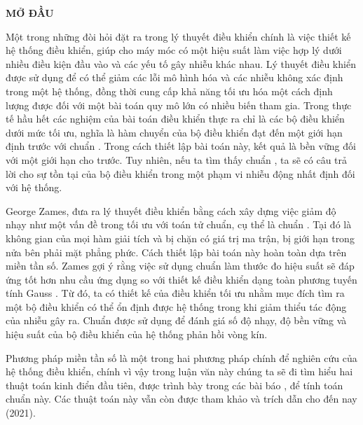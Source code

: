 \begin{center}
\textbf{\large {MỞ ĐẦU}}
\end{center}
\noindent 
Một trong những đòi hỏi đặt ra trong lý thuyết điều khiển chính là việc thiết kế hệ thống điều khiển, giúp cho máy móc có một hiệu suất làm việc hợp lý dưới nhiều điều kiện đầu vào và các yếu tố gây nhiễu khác nhau. Lý thuyết điều khiển \hinf được sử dụng để có thể giảm các lỗi mô hình hóa và các nhiễu không xác định trong một hệ thống, đồng thời cung cấp khả năng tối ưu hóa một cách định lượng được đối với một bài toán quy mô lớn có nhiều biến tham gia. Trong thực tế hầu hết các nghiệm của bài toán điều khiển \hinf thực ra chỉ là các bộ điều khiển dưới mức tối ưu, nghĩa là hàm chuyển của bộ điều khiển đạt đến một giới hạn định trước với chuẩn \hinf. Trong cách thiết lập bài toán này, kết quả là bền vững đối với một giới hạn cho trước. Tuy nhiên, nếu ta tìm thấy chuẩn \hinf, ta sẽ có câu trả lời cho sự tồn tại của bộ điều khiển trong một phạm vi nhiễu động nhất định đối với hệ thống.

\medskip
George Zames, \cite{23} đưa ra lý thuyết điều khiển \hinf bằng cách xây dựng việc giảm độ nhạy như một vấn đề trong tối ưu với toán tử chuẩn, cụ thể là chuẩn \hinf  \cite{15}. Tại đó \hinf là không gian của mọi hàm giải tích và bị chặn có giá trị ma trận, bị giới hạn trong nửa bên phải mặt phẳng phức. Cách thiết lập bài toán này hoàn toàn dựa trên miền tần số. Zames gợi ý rằng việc sử dụng chuẩn \hinf làm thước đo hiệu suất sẽ đáp ứng tốt hơn nhu cầu ứng dụng so với thiết kế điều khiển dạng toàn phương tuyến tính Gauss \cite{25}. Từ đó, ta có thiết kế của điều khiển tối ưu \hinf  nhằm mục đích tìm ra một bộ điều khiển có thể ổn định được hệ thống trong khi giảm thiểu tác động của nhiễu gây ra. Chuẩn \hinf được sử dụng để đánh giá số độ nhạy, độ bền vững và hiệu suất của bộ điều khiển của hệ thống phản hồi vòng kín.

\medskip
Phương pháp miền tần số là một trong hai phương pháp chính để nghiên cứu \hinf của hệ thống điều khiển, chính vì vậy trong luận văn này chúng ta sẽ đi tìm hiểu hai thuật toán kinh điển đầu tiên, được trình bày trong các bài báo \cite{3}, \cite{4} để tính toán chuẩn này. Các thuật toán này vẫn còn được tham khảo và trích dẫn cho đến nay (2021).